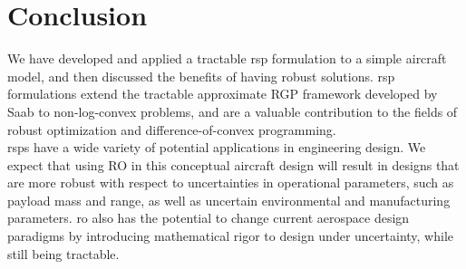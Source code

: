\section{Conclusion}

We have developed and applied a tractable \gls{rsp} formulation to a simple aircraft model,
and then discussed the benefits of having robust solutions. \gls{rsp} formulations extend
the tractable approximate RGP framework developed by Saab to non-log-convex problems,
and are a valuable contribution to the fields of robust optimization and difference-of-convex programming.\\

\gls{rsp}s have a wide variety of potential applications in engineering design.
We expect that using RO in this conceptual aircraft design will result in designs
that are more robust with respect to uncertainties in operational parameters,
such as payload mass and range, as well as uncertain environmental and manufacturing parameters. \gls{ro} also has
the potential to change current aerospace design paradigms by introducing
mathematical rigor to design under uncertainty, while still being tractable.


